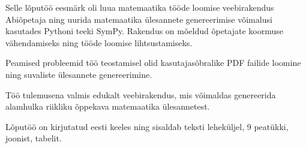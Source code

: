 Selle lõputöö eesmärk oli luua matemaatika tööde loomise veebirakendus Abiõpetaja ning uurida matemaatika ülesannete genereerimise võimalusi kasutades Pythoni teeki SymPy. Rakendus on mõeldud õpetajate koormuse vähendamiseks ning tööde loomise lihtsustamiseks.

Peamised probleemid töö teostamisel olid kasutajasõbralike PDF failide loomine ning suvaliste ülesannete genereerimine. 

Töö tulemusena valmis edukalt veebirakendus, mis võimaldas genereerida alamhulka riikliku õppekava matemaatika ülesannetest.

Lõputöö on kirjutatud eesti keeles ning sisaldab teksti  leheküljel, 9 peatükki,  joonist,  tabelit.

